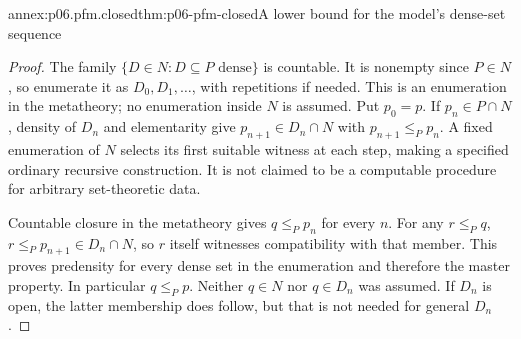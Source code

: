 \begin{annexitem}{annex:p06.pfm.closed}{thm:p06-pfm-closed}{A lower bound for the model's dense-set sequence}
\begin{proof}
The family \(\{D\in N:D\subseteq P\text{ dense}\}\) is countable.
It is nonempty since \(P\in N\), so enumerate it as \(D_0,D_1,\ldots\),
with repetitions if needed. This is an enumeration in the metatheory;
no enumeration inside \(N\) is assumed.
Put \(p_0=p\). If \(p_n\in P\cap N\), density of \(D_n\) and elementarity
give \(p_{n+1}\in D_n\cap N\) with \(p_{n+1}\leq_P p_n\).
A fixed enumeration of \(N\) selects its first suitable witness at each
step, making a specified ordinary recursive construction.
It is not claimed to be a computable procedure for arbitrary set-theoretic data.

Countable closure in the metatheory gives \(q\leq_P p_n\) for every \(n\).
For any \(r\leq_P q\), \(r\leq_P p_{n+1}\in D_n\cap N\),
so \(r\) itself witnesses compatibility with that member.
This proves predensity for every dense set in the enumeration and
therefore the master property. In particular \(q\leq_P p\).
Neither \(q\in N\) nor \(q\in D_n\) was assumed. If \(D_n\) is open,
the latter membership does follow, but that is not needed for general \(D_n\).
\end{proof}
\end{annexitem}

